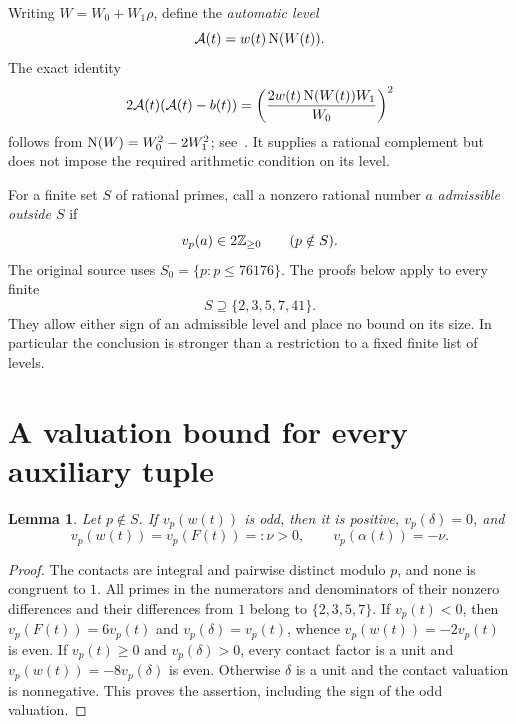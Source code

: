 \documentclass[11pt,a4paper]{article}
\newtheorem{lemma}[theorem]{Lemma}
\begin{document}
Writing $W=W_0+W_1\rho$, define the \emph{automatic level}
\begin{equation}\label{eq:automatic}
                         \mathcal A(t)=w(t)\operatorname{N}(W(t)).
\end{equation}
The exact identity
\begin{equation}\label{eq:complement}
 2\mathcal A(t)(\mathcal A(t)-b(t))
 =\left(\frac{2w(t)\operatorname{N}(W(t))W_1}{W_0}\right)^2
\end{equation}
follows from $\operatorname{N}(W)=W_0^2-2W_1^2$; see~\cite{Benchmark}.
It supplies a rational complement but does not impose the required
arithmetic condition on its level.

For a finite set $S$ of rational primes, call a nonzero rational number
$a$ \emph{admissible outside $S$} if
\begin{equation}\label{eq:admissible}
                       v_p(a)\in2\mathbb Z_{\ge0}\qquad(p\notin S).
\end{equation}
The original source uses $S_0=\{p:p\le76176\}$.
The proofs below apply to every finite
\begin{equation}\label{eq:S}
                        S\supseteq\{2,3,5,7,41\}.
\end{equation}
They allow either sign of an admissible level and place no bound on
its size. In particular the conclusion is stronger than a restriction
to a fixed finite list of levels.

\section{A valuation bound for every auxiliary tuple}

\begin{lemma}\label{lem:contact}
Let $p\notin S$. If $v_p(w(t))$ is odd, then it is positive,
$v_p(\delta)=0$, and
\[
                v_p(w(t))=v_p(F(t))=:\nu>0,
                \qquad v_p(\alpha(t))=-\nu.
\]
\end{lemma}
\begin{proof}
The contacts are integral and pairwise distinct modulo $p$, and none
is congruent to $1$. All primes in the numerators and denominators
of their nonzero differences and their differences from $1$ belong
to $\{2,3,5,7\}$.
If $v_p(t)<0$, then
$v_p(F(t))=6v_p(t)$ and $v_p(\delta)=v_p(t)$, whence
$v_p(w(t))=-2v_p(t)$ is even. If $v_p(t)\ge0$ and
$v_p(\delta)>0$, every contact factor is a unit and
$v_p(w(t))=-8v_p(\delta)$ is even. Otherwise $\delta$ is a
unit and the contact valuation is nonnegative. This proves the
assertion, including the sign of the odd valuation.
\end{proof}
\end{document}
